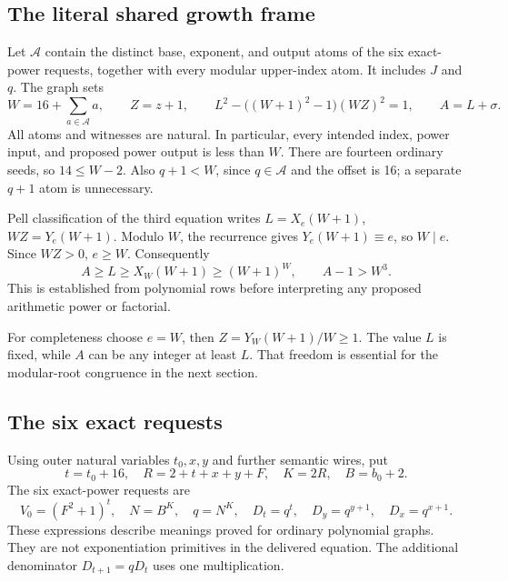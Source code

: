 \documentclass[11pt,a4paper]{article}
\theoremstyle{remark}
\begin{document}
\subsection{The literal shared growth frame}

Let \(\mathcal A\) contain the distinct base, exponent, and output atoms of
the six exact-power requests, together with every modular upper-index atom.
It includes \(J\) and \(q\). The graph sets
\begin{equation}\label{eq:frame}
 W=16+\sum_{a\in\mathcal A}a,
 \qquad Z=z+1,
 \qquad
 L^2-\big((W+1)^2-1\big)(WZ)^2=1,
 \qquad A=L+\sigma.
\end{equation}
All atoms and witnesses are natural. In particular, every intended index,
power input, and proposed power output is less than \(W\). There are
fourteen ordinary seeds, so \(14\le W-2\). Also \(q+1<W\), since
\(q\in\mathcal A\) and the offset is 16; a separate \(q+1\) atom is
unnecessary.

Pell classification of the third equation writes
\(L=X_e(W+1)\), \(WZ=Y_e(W+1)\). Modulo \(W\), the recurrence gives
\(Y_e(W+1)\equiv e\), so \(W\mid e\). Since \(WZ>0\), \(e\ge W\).
Consequently
\begin{equation}\label{eq:largeA}
 A\ge L\ge X_W(W+1)\ge(W+1)^W,
 \qquad A-1>W^3.
\end{equation}
This is established from polynomial rows before interpreting any proposed
arithmetic power or factorial.

For completeness choose \(e=W\), then \(Z=Y_W(W+1)/W\ge1\).
The value \(L\) is fixed, while \(A\) can be any integer at least \(L\).
That freedom is essential for the modular-root congruence in the next section.

\subsection{The six exact requests}

Using outer natural variables \(t_0,x,y\) and further semantic wires, put
\begin{equation}\label{eq:semantic}
 t=t_0+16,\quad R=2+t+x+y+F,\quad K=2R,\quad B=b_0+2.
\end{equation}
The six exact-power requests are
\begin{equation}\label{eq:sixpowers}
 V_0=(F^2+1)^t,\quad N=B^K,\quad q=N^K,\quad
 D_t=q^t,\quad D_y=q^{y+1},\quad D_x=q^{x+1}.
\end{equation}
These expressions describe meanings proved for ordinary polynomial graphs.
They are not exponentiation primitives in the delivered equation.
The additional denominator \(D_{t+1}=qD_t\) uses one multiplication.
\end{document}
